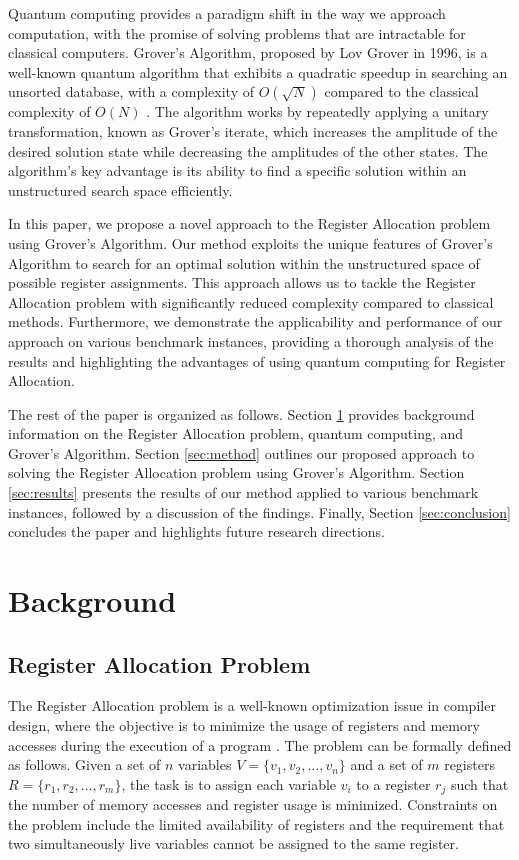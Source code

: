 Quantum computing provides a paradigm shift in the way we approach computation, with the promise of solving problems that are intractable for classical computers. Grover's Algorithm, proposed by Lov Grover in 1996, is a well-known quantum algorithm that exhibits a quadratic speedup in searching an unsorted database, with a complexity of $O(\sqrt{N})$ compared to the classical complexity of $O(N)$ \cite{grover}. The algorithm works by repeatedly applying a unitary transformation, known as Grover's iterate, which increases the amplitude of the desired solution state while decreasing the amplitudes of the other states. The algorithm's key advantage is its ability to find a specific solution within an unstructured search space efficiently.

In this paper, we propose a novel approach to the Register Allocation problem using Grover's Algorithm. Our method exploits the unique features of Grover's Algorithm to search for an optimal solution within the unstructured space of possible register assignments. This approach allows us to tackle the Register Allocation problem with significantly reduced complexity compared to classical methods. Furthermore, we demonstrate the applicability and performance of our approach on various benchmark instances, providing a thorough analysis of the results and highlighting the advantages of using quantum computing for Register Allocation.

The rest of the paper is organized as follows. Section \ref{sec:background} provides background information on the Register Allocation problem, quantum computing, and Grover's Algorithm. Section \ref{sec:method} outlines our proposed approach to solving the Register Allocation problem using Grover's Algorithm. Section \ref{sec:results} presents the results of our method applied to various benchmark instances, followed by a discussion of the findings. Finally, Section \ref{sec:conclusion} concludes the paper and highlights future research directions.

\section{Background} \label{sec:background}

\subsection{Register Allocation Problem}

The Register Allocation problem is a well-known optimization issue in compiler design, where the objective is to minimize the usage of registers and memory accesses during the execution of a program \cite{register_allocation}. The problem can be formally defined as follows. Given a set of $n$ variables $V = \{v_1, v_2, \ldots, v_n\}$ and a set of $m$ registers $R = \{r_1, r_2, \ldots, r_m\}$, the task is to assign each variable $v_i$ to a register $r_j$ such that the number of memory accesses and register usage is minimized. Constraints on the problem include the limited availability of registers and the requirement that two simultaneously live variables cannot be assigned to the same register.

